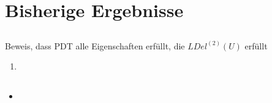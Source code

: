 \documentclass[compress]{beamer}
\begin{document}
\section{Bisherige Ergebnisse}
\subsection{}
\begin{frame}
	Beweis, dass PDT alle Eigenschaften erfüllt, die $LDel^{(2)}(U) $ erfüllt 
	\begin{enumerate}
		\item 
	\end{enumerate}
\end{frame}

\subsection{}%
\begin{frame}
	\begin{itemize}
		\item 
	\end{itemize}
\end{frame}
\end{document}
